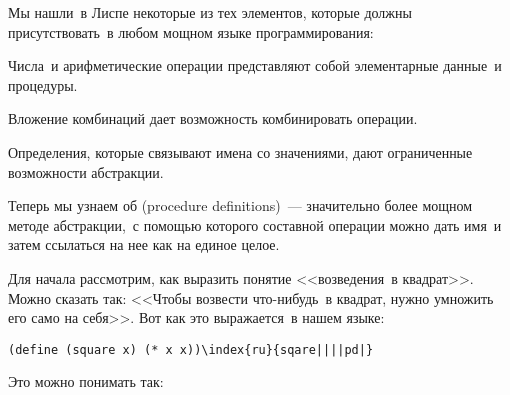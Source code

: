 Мы нашли~в Лиспе некоторые из тех элементов, которые
должны присутствовать~в любом мощном языке программирования:

\begin{plainlist}
\item
  Числа~и арифметические операции
  представляют собой элементарные данные~и процедуры.

\item
  Вложение комбинаций дает возможность комбинировать 
  операции.

\item
  Определения, которые связывают имена со
  значениями, дают ограниченные возможности абстракции.
\end{plainlist}
Теперь мы узнаем об
 (procedure definitions)~---
значительно более мощном методе абстракции,~с помощью
которого составной операции можно дать имя~и затем ссылаться на нее
как на единое целое.

Для начала рассмотрим, как выразить понятие
<<возведения~в квадрат>>.  Можно сказать так: <<Чтобы возвести 
что-нибудь~в квадрат, нужно умножить его само на себя>>. Вот как это
выражается~в нашем языке:

\begin{Verbatim}[fontsize=\small]
(define (square x) (* x x))\index{ru}{sqare||||pd|}
\end{Verbatim}


Это можно понимать так:

